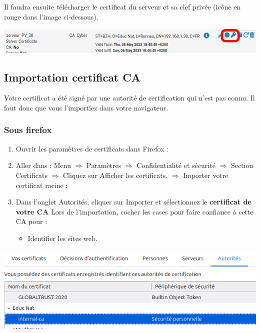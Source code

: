 \documentclass[french, 12pt]{article}%
\newcommand{\itemE}{\item[$\bullet$]}
\begin{document}
Il faudra ensuite télécharger le certificat du serveur et sa clef privée (icône en rouge dans l'image ci-dessous).
\begin{center}
\includegraphics[scale=0.5]{./ressource/certif_serveur}
\end{center}





\subsection{Importation certificat CA }
Votre certificat a été signé par une autorité de certification qui n'est pas connu. Il faut donc que vous l'importiez dans votre navigateur.

\subsubsection{Sous firefox}
\begin{enumerate}
\item Ouvrir les paramètres de certificats dans Firefox :
\item Aller dans :
Menu $\Rightarrow$ Paramètres  $\Rightarrow$  Confidentialité et sécurité  $\Rightarrow$ Section Certificats  $\Rightarrow$  Cliquez sur Afficher les certificats.  $\Rightarrow$ Importer votre certificat racine :
\item Dans l'onglet Autorités, cliquer sur Importer et sélectionnez le  \textbf{certificat de votre CA}
Lors de l'importation, cocher les cases pour faire confiance à cette CA pour :
\begin{itemize}
\itemE Identifier les sites web.
\end{itemize}
\end{enumerate}

\begin{center}
\includegraphics[scale=0.7]{./ressource/newCA}
\end{center}
\end{document}
